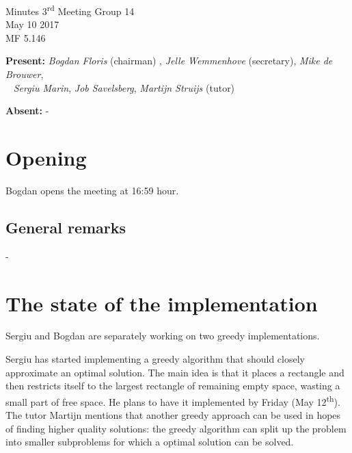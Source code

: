 \documentclass[a4paper,twoside,11pt]{article}
\title{}
\date{}
\newcommand{\ts}{\textsuperscript}
\begin{document}



\begin{center}
\Huge{Minutes 3\ts{rd} Meeting Group 14}
\\\vspace*{2mm}
\Large{May 10 2017}
\\\vspace*{2mm}
\large{MF 5.146}
\\
		\end{center}

		\textbf{Present:}  \textit{Bogdan Floris} (chairman) , \textit{Jelle Wemmenhove} (secretary), \textit{Mike de Brouwer},  
\\\indent\qquad\,\,\,\,\,\qquad\quad \textit{Sergiu Marin}, \textit{Job Savelsberg}, \textit{Martijn Struijs} (tutor)


	    \textbf{Absent:} -\\
	    
	    \hline

\linenumbers
\modulolinenumbers[5]

	\section{Opening}
	
	Bogdan opens the meeting at 16:59 hour.
	
	\subsection{General remarks}
	
	- 
	
	\section{The state of the implementation}
	
	Sergiu and Bogdan are separately working on two greedy implementations.
	
	Sergiu has started implementing a greedy algorithm that should closely approximate an optimal solution. The main idea is that it places a rectangle and then restricts itself to the largest rectangle of remaining empty space, wasting a small part of free space. He plans to have it implemented by Friday (May 12\ts{th}). The tutor Martijn mentions that another greedy approach can be used in hopes of finding higher quality solutions: the greedy algorithm can split up the problem into smaller subproblems for which a optimal solution can be solved. 
	
\end{document}
